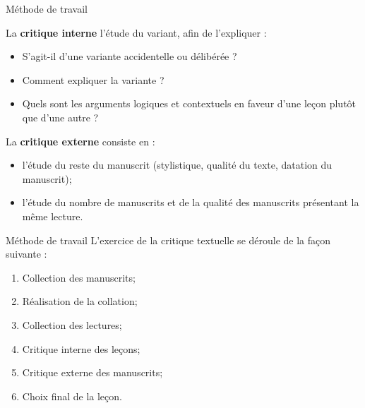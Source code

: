 \documentclass[11pt]{beamer}
\begin{document}
\begin{frame}{Méthode de travail}
    \begin{alertblock}{}
        La \textbf{critique interne} l'étude du variant, afin de l'expliquer :
        \begin{itemize}
        \item S'agit-il d'une variante accidentelle ou délibérée ? 
        \item Comment expliquer la variante ?
        \item Quels sont les arguments logiques et contextuels en faveur d'une leçon plutôt que d'une autre ? 
        \end{itemize}
    \end{alertblock}

    \begin{alertblock}{}
        La \textbf{critique externe} consiste en :
        \begin{itemize}
            \item l'étude du reste du manuscrit (stylistique, qualité du texte, datation du manuscrit);
            \item l'étude du nombre de manuscrits et de la qualité des manuscrits présentant la même lecture.
        \end{itemize}
    \end{alertblock}
\end{frame}

\begin{frame}{Méthode de travail}
L'exercice de la critique textuelle se déroule de la façon suivante :
    \begin{enumerate}
        \item Collection des manuscrits;
        \pause
        
        \item Réalisation de la collation;
                \pause


        \item Collection des lectures;
                \pause


        \item Critique interne des leçons;
                \pause


        \item Critique externe des manuscrits;
                \pause


        \item Choix final de la leçon.
    \end{enumerate}
\end{frame}
\end{document}
